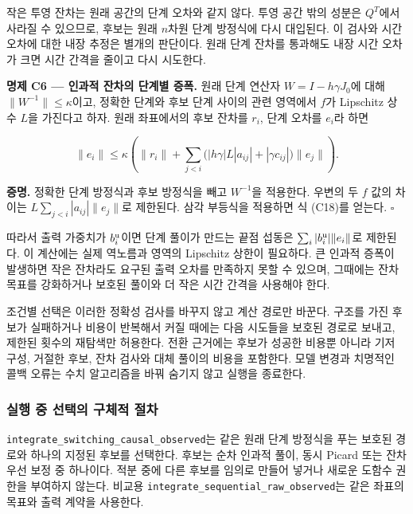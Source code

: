 \documentclass[
  10pt,
  dvipsnames]{article}
\begin{document}
작은 투영 잔차는 원래 공간의 단계 오차와 같지 않다. 투영 공간 밖의
성분은 \(Q^T\)에서 사라질 수 있으므로, 후보는 원래 \(n\)차원 단계
방정식에 다시 대입된다. 이 검사와 시간 오차에 대한 내장 추정은 별개의
판단이다. 원래 단계 잔차를 통과해도 내장 시간 오차가 크면 시간 간격을
줄이고 다시 시도한다.

\textbf{명제 C6 --- 인과적 잔차의 단계별 증폭.} 원래 단계 연산자
\(W=I-h\gamma J_0\)에 대해 \(\|W^{-1}\|\le\kappa\)이고, 정확한 단계와
후보 단계 사이의 관련 영역에서 \(f\)가 Lipschitz 상수 \(L\)을 가진다고
하자. 원래 좌표에서의 후보 잔차를 \(r_i\), 단계 오차를 \(e_i\)라 하면

\[
 \|e_i\|\le\kappa\left(\|r_i\|+
      \sum_{j<i}\bigl(|h\gamma|L|a_{ij}|+|\gamma c_{ij}|\bigr)\|e_j\|\right).
 \tag{C18}
\]

\textbf{증명.} 정확한 단계 방정식과 후보 방정식을 빼고 \(W^{-1}\)을
적용한다. 우변의 두 \(f\) 값의 차이는 \(L\sum_{j<i}|a_{ij}|\|e_j\|\)로
제한된다. 삼각 부등식을 적용하면 식 (C18)를 얻는다. \(\square\)

따라서 출력 가중치가 \(b_i^{\rm u}\)이면 단계 풀이가 만드는 끝점 섭동은
\(\sum_i|b_i^{\rm u}|\|e_i\|\)로 제한된다. 이 계산에는 실제 역노름과
영역의 Lipschitz 상한이 필요하다. 큰 인과적 증폭이 발생하면 작은
잔차라도 요구된 출력 오차를 만족하지 못할 수 있으며, 그때에는 잔차
목표를 강화하거나 보호된 풀이와 더 작은 시간 간격을 사용해야 한다.

조건별 선택은 이러한 정확성 검사를 바꾸지 않고 계산 경로만 바꾼다.
구조를 가진 후보가 실패하거나 비용이 반복해서 커질 때에는 다음 시도들을
보호된 경로로 보내고, 제한된 횟수의 재탐색만 허용한다. 전환 근거에는
후보가 성공한 비용뿐 아니라 기저 구성, 거절한 후보, 잔차 검사와 대체
풀이의 비용을 포함한다. 모델 변경과 치명적인 콜백 오류는 수치 알고리즘을
바꿔 숨기지 않고 실행을 종료한다.

\hypertarget{uxc2e4uxd589-uxc911-uxc120uxd0dduxc758-uxad6cuxccb4uxc801-uxc808uxcc28}{%
\subsubsection{실행 중 선택의 구체적
절차}\label{uxc2e4uxd589-uxc911-uxc120uxd0dduxc758-uxad6cuxccb4uxc801-uxc808uxcc28}}

\texttt{integrate\_switching\_causal\_observed}는 같은 원래 단계
방정식을 푸는 보호된 경로와 하나의 지정된 후보를 선택한다. 후보는 순차
인과적 풀이, 동시 Picard 또는 잔차 우선 보정 중 하나이다. 적분 중에 다른
후보를 임의로 만들어 넣거나 새로운 도함수 권한을 부여하지 않는다. 비교용
\texttt{integrate\_sequential\_raw\_observed}는 같은 좌표의 목표와 출력
계약을 사용한다.
\end{document}
